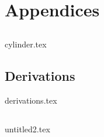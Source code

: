 \documentclass[UKenglish]{texmex/uiomasterthesis}
\begin{document}
















\backmatter{}






\part*{Appendices}

\appendix





\chapter{}\label{app:special}
    {{cylinder.tex}}

\chapter{Derivations}\label{app:derivations}
    {{derivations.tex}}


\chapter{}\label{app:untitled2}
    {{untitled2.tex}}




    





\end{document}
